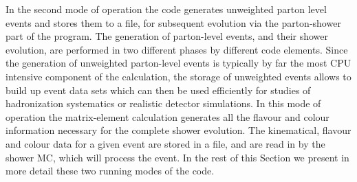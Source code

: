 \documentclass[paper]{JHEP3}
\begin{document}
In the second mode of operation the code generates unweighted parton
level events and stores them to a file, for subsequent evolution via
the parton-shower part of the program. The generation of parton-level
events, and their shower evolution, are performed in two different
phases by different code elements. Since the generation of unweighted
parton-level events is typically by far the most CPU intensive
component of the calculation, the storage of unweighted events allows
to build up event data sets which can then be used efficiently for
studies of hadronization systematics or realistic detector
simulations. In this mode of operation the matrix-element calculation
generates all the flavour and colour information necessary for the
complete shower evolution. The kinematical,
flavour and colour data for a given event are stored in a file, and
are read in by the shower MC, which will process the event.
In the rest of this Section we present in more detail these two running
modes of the code.
\end{document}
